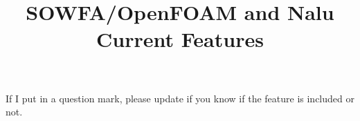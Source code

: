 \documentclass{article}
\begin{document}
\title{SOWFA/OpenFOAM and Nalu Current Features}
\maketitle




If I put in a question mark, please update if you know if the feature is included or not.
\end{document}
